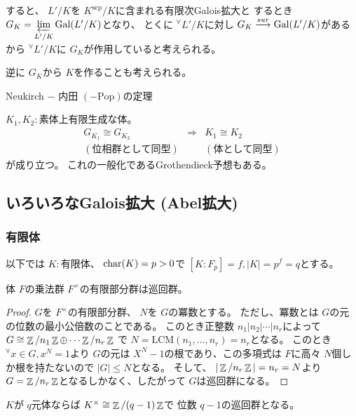 \documentclass[../master_galois_theory]{subfiles}
\begin{document}
すると、 $L'/K$を $K^{\mathrm{sep}}/K$に含まれる有限次\rm{Galois}拡大と
するとき $G_K = \mathop{\varprojlim}\limits_{L'/K} \mathop{\mathrm{Gal}}\nolimits(L'/K)$となり、
とくに ${}^\forall L'/K$に対し
$G_K \overset{sur}{\longrightarrow} \mathop{\mathrm{Gal}}\nolimits(L'/K)$があるから
${}^\forall L'/K$に $G_K$が作用していると考えられる。

逆に $G_K$から $K$を作ることも考えられる。

\begin{theo}
  \rm{Neukirch} $-$ 内田 $(- \mathrm{Pop})$の定理

  $K_1 , K_2:$素体上有限生成な体。
  \begin{eqnarray*}
    G_{K_1} \cong G_{K_2} & \Rightarrow & K_1 \cong K_2 \\
    (位相群として同型) &  & (体として同型)
  \end{eqnarray*}
  が成り立つ。
  これの一般化である\rm{Grothendieck}予想もある。
\end{theo}

\subsection{いろいろなGalois拡大 (Abel拡大)}

\subsubsection{有限体}

以下では $K:$有限体、 $\mathop{\mathrm{char}}\nolimits(K) = p > 0$で
$[K:F_p] = f , |K| = p^f = q$とする。

\begin{lemm} \label{lemm12.4}
  体 $F$の乗法群 $F^\times$の有限部分群は巡回群。
\end{lemm}

\begin{proof}
  $G$を $F^\times$の有限部分群、 $N$を $G$の冪数とする。
  ただし、冪数とは $G$の元の位数の最小公倍数のことである。
  このとき正整数 $n_1 | n_2 | \cdots | n_r$によって
  $G \cong \mathop{\mathbb{Z}}\nolimits/n_1 \mathop{\mathbb{Z}}\nolimits \oplus \cdots \mathop{\mathbb{Z}}\nolimits/n_r \mathop{\mathbb{Z}}\nolimits$
  で $N = \mathrm{LCM} (n_1 , \dots , n_r) = n_r$となる。
  このとき ${}^\forall x \in G , x^N = 1$より
  $G$の元は $X^N - 1$の根であり、この多項式は $F$に高々 $N$個しか根を持たないので
  $|G| \leq N$となる。
  そして、 $|\mathop{\mathbb{Z}}\nolimits/n_r \mathop{\mathbb{Z}}\nolimits| = n_r = N$より
  $G = \mathop{\mathbb{Z}}\nolimits/n_r \mathop{\mathbb{Z}}\nolimits$となるしかなく、したがって $G$は巡回群になる。
\end{proof}

\begin{corl} \label{corl:12.5}
  $K$が $q$元体ならば $K^\times \cong \mathop{\mathbb{Z}}\nolimits/(q-1)\mathop{\mathbb{Z}}\nolimits$で
  位数 $q - 1$の巡回群となる。
\end{corl}
\end{document}

